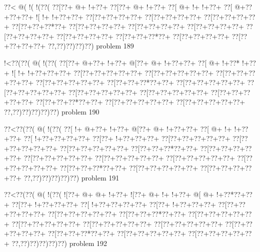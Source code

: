 \vbox{\vbox{\goo
\0??<\- @(\- !(\- !(\0??(
\0??[\0??+\- @+\- !+\0??+
\0??[\0??+\- @+\- !+\0??+
\0??[\- @+\- !+\- !+\0??+
\0??[\- @+\0??+\0??+\0??+
\- ![\- !+\- !+\0??+\0??+
\0??[\0??+\0??+\0??+\0??+
\0??[\0??+\0??+\0??+\0??+
\0??[\0??+\0??+\0??+\0??+
\0??[\0??+\0??+\0??*\0??+
\0??[\0??+\0??+\0??+\0??+
\0??[\0??+\0??+\0??+\0??+
\0??[\0??+\0??+\0??+\0??+
\0??[\0??+\0??+\0??+\0??+
\0??[\0??+\0??+\0??+\0??+
\0??[\0??+\0??+\0??*\0??+
\0??[\0??+\0??+\0??+\0??+
\0??[\0??+\0??+\0??+\0??+
\0??,\0??)\0??)\0??)\0??)
}
\hfil problem 189\hfil\break
}

\vbox{\vbox{\goo
\- !<\0??(\0??(\- @(\- !(\0??(
\0??[\0??+\- @+\0??+\- !+\0??+
\- @[\0??+\- @+\- !+\0??+\0??+
\0??[\- @+\- !+\0??*\- !+\0??+
\- ![\- !+\- !+\0??+\0??+\0??+
\0??[\0??+\0??+\0??+\0??+\0??+
\0??[\0??+\0??+\0??+\0??+\0??+
\0??[\0??+\0??+\0??+\0??+\0??+
\0??[\0??+\0??+\0??+\0??+\0??+
\0??[\0??+\0??+\0??*\0??+\0??+
\0??[\0??+\0??+\0??+\0??+\0??+
\0??[\0??+\0??+\0??+\0??+\0??+
\0??[\0??+\0??+\0??+\0??+\0??+
\0??[\0??+\0??+\0??+\0??+\0??+
\0??[\0??+\0??+\0??+\0??+\0??+
\0??[\0??+\0??+\0??*\0??+\0??+
\0??[\0??+\0??+\0??+\0??+\0??+
\0??[\0??+\0??+\0??+\0??+\0??+
\0??,\0??)\0??)\0??)\0??)\0??)
}
\hfil problem 190\hfil\break
}

\vbox{\vbox{\goo
\0??<\0??(\0??(\- @(\- !(\0??(
\0??[\- !+\- @+\0??+\- !+\0??+
\- @[\0??+\- @+\- !+\0??+\0??+
\0??[\- @+\- !+\- !+\0??+\0??+
\0??[\- !+\0??+\0??+\0??+\0??+
\0??[\0??+\- !+\0??+\0??+\0??+
\0??[\0??+\0??+\0??+\0??+\0??+
\0??[\0??+\0??+\0??+\0??+\0??+
\0??[\0??+\0??+\0??+\0??+\0??+
\0??[\0??+\0??+\0??*\0??+\0??+
\0??[\0??+\0??+\0??+\0??+\0??+
\0??[\0??+\0??+\0??+\0??+\0??+
\0??[\0??+\0??+\0??+\0??+\0??+
\0??[\0??+\0??+\0??+\0??+\0??+
\0??[\0??+\0??+\0??+\0??+\0??+
\0??[\0??+\0??+\0??*\0??+\0??+
\0??[\0??+\0??+\0??+\0??+\0??+
\0??[\0??+\0??+\0??+\0??+\0??+
\0??,\0??)\0??)\0??)\0??)\0??)
}
\hfil problem 191\hfil\break
}

\vbox{\vbox{\goo
\0??<\0??(\0??(\- @(\- !(\0??(
\- ![\0??+\- @+\- @+\- !+\0??+
\- ![\0??+\- @+\- !+\- !+\0??+
\- @[\- @+\- !+\0??*\0??+\0??+
\0??[\0??+\- !+\0??+\0??+\0??+
\0??[\- !+\0??+\0??+\0??+\0??+
\0??[\0??+\- !+\0??+\0??+\0??+
\0??[\0??+\0??+\0??+\0??+\0??+
\0??[\0??+\0??+\0??+\0??+\0??+
\0??[\0??+\0??+\0??*\0??+\0??+
\0??[\0??+\0??+\0??+\0??+\0??+
\0??[\0??+\0??+\0??+\0??+\0??+
\0??[\0??+\0??+\0??+\0??+\0??+
\0??[\0??+\0??+\0??+\0??+\0??+
\0??[\0??+\0??+\0??+\0??+\0??+
\0??[\0??+\0??+\0??*\0??+\0??+
\0??[\0??+\0??+\0??+\0??+\0??+
\0??[\0??+\0??+\0??+\0??+\0??+
\0??,\0??)\0??)\0??)\0??)\0??)
}
\hfil problem 192\hfil\break
}

